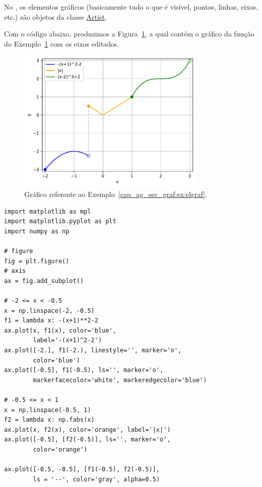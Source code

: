 No {\matplotlib}, os elementos gráficos (basicamente tudo o que é visível, pontos, linhas, eixos, etc.) são objetos da classe \href{https://matplotlib.org/stable/api/artist_api.html#artist-class}{Artist}.

\begin{ex}\label{cap_ag_sec_graf:ex:elgraf}
  Com o código abaixo, produzimos a Figura~\ref{cap_ag_sec_graf:fig:elgraf}, a qual contém o gráfico da função do Exemplo~\ref{cap_ag_sec_graf:fig:elgraf} com os eixos editados.

  \begin{figure}[H]
    \centering
    \includegraphics[width=0.8\textwidth]{./cap_ag/dados/fig_elgraf/fig}
    \caption{Gráfico referente ao Exemplo~\ref{cap_ag_sec_graf:ex:elgraf}.}
    \label{cap_ag_sec_graf:fig:elgraf}
  \end{figure}
  
\begin{lstlisting}
import matplotlib as mpl
import matplotlib.pyplot as plt
import numpy as np

# figure
fig = plt.figure()
# axis
ax = fig.add_subplot()

# -2 <= x < -0.5
x = np.linspace(-2, -0.5)
f1 = lambda x: -(x+1)**2-2
ax.plot(x, f1(x), color='blue',
        label='-(x+1)^2-2')
ax.plot([-2.], f1(-2.), linestyle='', marker='o',
        color='blue')
ax.plot([-0.5], f1(-0.5), ls='', marker='o',
        markerfacecolor='white', markeredgecolor='blue')

# -0.5 <= x < 1
x = np.linspace(-0.5, 1)
f2 = lambda x: np.fabs(x)
ax.plot(x, f2(x), color='orange', label='|x|')
ax.plot([-0.5], [f2(-0.5)], ls='', marker='o',
        color='orange')

ax.plot([-0.5, -0.5], [f1(-0.5), f2(-0.5)],
        ls = '--', color='gray', alpha=0.5)


\end{lstlisting}
\end{ex}
